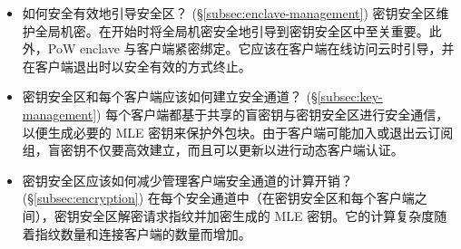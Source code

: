 \begin{itemize}[leftmargin=*]
\item 如何安全有效地引导安全区？ (\S\ref{subsec:enclave-management})
  密钥安全区维护全局机密。在开始时将全局机密安全地引导到密钥安全区中至关重要。此外，PoW enclave 与客户端紧密绑定。它应该在客户端在线访问云时引导，并在客户端退出时以安全有效的方式终止。
\item 密钥安全区和每个客户端应该如何建立安全通道？ (\S\ref{subsec:key-management})
  每个客户端都基于共享的盲密钥与密钥安全区进行安全通信，以便生成必要的 MLE 密钥来保护外包块。由于客户端可能加入或退出云订阅组，盲密钥不仅要高效建立，而且可以更新以进行动态客户端认证。
\item 密钥安全区应该如何减少管理客户端安全通道的计算开销？ (\S\ref{subsec:encryption})
  在每个安全通道中（在密钥安全区和每个客户端之间），密钥安全区解密请求指纹并加密生成的 MLE 密钥。它的计算复杂度随着指纹数量和连接客户端的数量而增加。
\end{itemize}

